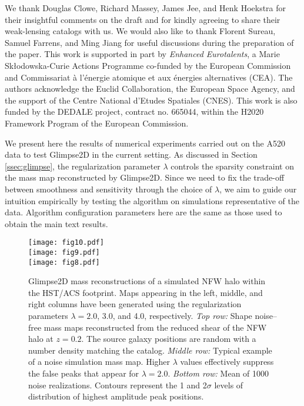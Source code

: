 \documentclass[iop,twocolappendix]{emulateapj}
\newcommand{\cta}[1]{\citetalias{#1}}
\begin{document}
\acknowledgments
We thank Douglas Clowe, Richard Massey, James Jee, and Henk Hoekstra for their insightful 
comments on the draft and for kindly agreeing to share their weak-lensing catalogs with us.
We would also like to thank Florent Sureau, Samuel Farrens, and Ming Jiang for useful 
discussions during the preparation of the paper. 
This work is supported in part by \textit{Enhanced Eurotalents}, a Marie Sk{\l}odowska-Curie 
Actions Programme co-funded by the European Commission and Commissariat {\`a} l'{\'e}nergie 
atomique et aux {\'e}nergies alternatives (CEA).
The authors acknowledge the Euclid Collaboration, the European Space Agency, and the support of 
the Centre National d'Etudes Spatiales (CNES).
This work is also funded by the DEDALE project, contract no. 665044, within the H2020 Framework 
Program of the European Commission.

\appendix
We present here the results of numerical experiments carried out on the A520 data to test 
Glimpse2D in the current setting. As discussed in Section \ref{ssec:glimpse}, the regularization
parameter $\lambda$ controls the sparsity constraint on the mass map reconstructed by Glimpse2D.
Since we need to fix the trade-off between smoothness and sensitivity through the choice of
$\lambda$, we aim to guide our intuition empirically by testing the algorithm on simulations 
representative of the data. Algorithm configuration parameters here are the same as 
those used to obtain the main text results.

\begin{figure*}
\centering
\texttt{[image: fig10.pdf]}\\
\texttt{[image: fig9.pdf]}\\
\texttt{[image: fig8.pdf]}
\caption{Glimpse2D mass reconstructions of a simulated NFW halo within the HST/ACS footprint. Maps
         appearing in the left, middle, and right columns have been generated using the regularization 
         parameters $\lambda=2.0$, 3.0, and 4.0, respectively. \textit{Top row:} Shape noise--free
         mass maps reconstructed from the reduced shear of the NFW halo at $z=0.2$. The source galaxy
         positions are random with a number density matching the \cta{J14} catalog.
         \textit{Middle row:} Typical example of a noise simulation mass map. Higher $\lambda$ values
         effectively suppress the false peaks that appear for $\lambda=2.0$.
         \textit{Bottom row:} Mean of 1000 noise realizations. Contours represent the 1 and 2$\sigma$
         levels of distribution of highest amplitude peak positions.}
\label{fig:fig8}
\end{figure*}
\end{document}
